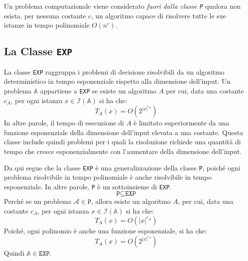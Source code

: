 Un problema computazionale viene considerato \textit{fuori dalla classe \texttt{P}} qualora
non esista, per nessuna costante $c$, un algoritmo capace di risolvere tutte le sue istanze
in tempo polinomiale $O(n^c)$.

\subsection{La Classe \texttt{EXP}}
\begin{tcolorbox}[title={Classe \texttt{EXP}}]
    La classe \texttt{EXP} raggruppa i problemi di decisione risolvibili da un algoritmo
    deterministico in tempo esponenziale rispetto
    alla dimensione dell'input. Un problema $\mathbb{A}$ appartiene a \texttt{EXP} se
    esiste un algoritmo $A$ per cui, data una costante $c_A$, per ogni istanza $x \in
    \mathscr{I}(\mathbb{A})$ si ha che:
    \[
        T_A(x) = O(2^{|x|^{c_A}})
    \]
    In altre parole, il tempo di esecuzione di $A$ è limitato superiormente da una
    funzione esponenziale della dimensione dell'input elevata a una costante. Questa
    classe include quindi problemi per i quali la risoluzione richiede una quantità di
    tempo che cresce esponenzialmente con l'aumentare della dimensione dell'input.
\end{tcolorbox}
Da qui segue che la classe \texttt{EXP} è una generalizzazione della classe \texttt{P},
poiché ogni problema risolvibile in tempo polinomiale è anche risolvibile in tempo
esponenziale. In altre parole, \texttt{P} è un sottoinsieme di \texttt{EXP}.
\[ \texttt{P} \subseteq \texttt{EXP} \]
Perché se un problema $\mathcal{A} \in \texttt{P}$, allora esiste un algoritmo $A$, 
per cui, data una costante $c_A$, per ogni istanza $x \in \mathscr{I}(\mathbb{A})$ si ha che:
\[ T_A(x) = O(|x|^{c_A}) \]
Poiché, ogni polinomio è anche una funzione esponenziale, si ha che:
\[ T_A(x) = O(2^{|x|^{c_A}}) \]
Quindi $\mathbb{A} \in \texttt{EXP}$.

